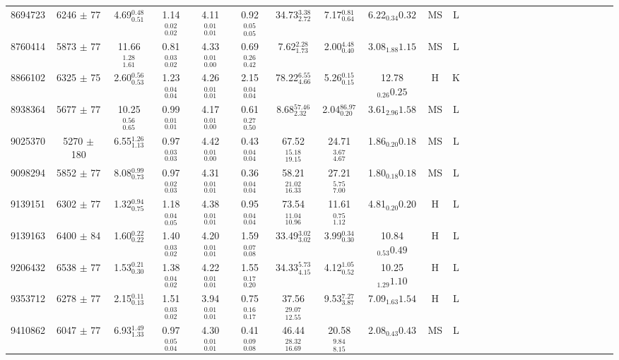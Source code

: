 \begin{table}
\begin{tabular}{cccccccccccccccccccccccccc}
8694723  & 6246 $\pm$ 77 & 4.69$_{0.51}^{0.48}$ & 1.14$_{0.02}^{0.02}$ & 4.11$_{0.01}^{0.01}$ & 0.92$_{0.05}^{0.05}$ & 34.73$_{2.72}^{3.38}$ & 7.17$_{0.64}^{0.81}$ & 6.22$_{0.34}{0.32}$ & MS & L \\
8760414  & 5873 $\pm$ 77 & 11.66$_{1.61}^{1.28}$ & 0.81$_{0.02}^{0.03}$ & 4.33$_{0.00}^{0.01}$ & 0.69$_{0.42}^{0.26}$ & 7.62$_{1.73}^{2.28}$ & 2.00$_{0.40}^{4.48}$ & 3.08$_{1.88}{1.15}$ & MS & L \\
8866102  & 6325 $\pm$ 75 & 2.60$_{0.53}^{0.56}$ & 1.23$_{0.04}^{0.04}$ & 4.26$_{0.01}^{0.01}$ & 2.15$_{0.04}^{0.04}$ & 78.22$_{4.66}^{6.55}$ & 5.26$_{0.15}^{0.15}$ & 12.78$_{0.26}{0.25}$ & H & K \\
8938364  & 5677 $\pm$ 77 & 10.25$_{0.65}^{0.56}$ & 0.99$_{0.01}^{0.01}$ & 4.17$_{0.00}^{0.01}$ & 0.61$_{0.50}^{0.27}$ & 8.68$_{2.32}^{57.46}$ & 2.04$_{0.20}^{86.97}$ & 3.61$_{2.96}{1.58}$ & MS & L \\
9025370  & 5270 $\pm$ 180 & 6.55$_{1.13}^{1.26}$ & 0.97$_{0.03}^{0.03}$ & 4.42$_{0.00}^{0.01}$ & 0.43$_{0.04}^{0.04}$ & 67.52$_{19.15}^{15.18}$ & 24.71$_{4.67}^{3.67}$ & 1.86$_{0.20}{0.18}$ & MS & L \\
9098294  & 5852 $\pm$ 77 & 8.08$_{0.73}^{0.99}$ & 0.97$_{0.03}^{0.02}$ & 4.31$_{0.01}^{0.01}$ & 0.36$_{0.04}^{0.04}$ & 58.21$_{16.33}^{21.02}$ & 27.21$_{7.00}^{5.75}$ & 1.80$_{0.18}{0.18}$ & MS & L \\
9139151  & 6302 $\pm$ 77 & 1.32$_{0.75}^{0.94}$ & 1.18$_{0.05}^{0.04}$ & 4.38$_{0.01}^{0.01}$ & 0.95$_{0.04}^{0.04}$ & 73.54$_{10.96}^{11.04}$ & 11.61$_{1.12}^{0.75}$ & 4.81$_{0.20}{0.20}$ & H & L \\
9139163  & 6400 $\pm$ 84 & 1.60$_{0.22}^{0.22}$ & 1.40$_{0.02}^{0.03}$ & 4.20$_{0.01}^{0.01}$ & 1.59$_{0.08}^{0.07}$ & 33.49$_{3.02}^{3.02}$ & 3.99$_{0.30}^{0.34}$ & 10.84$_{0.53}{0.49}$ & H & L \\
9206432  & 6538 $\pm$ 77 & 1.53$_{0.30}^{0.21}$ & 1.38$_{0.02}^{0.04}$ & 4.22$_{0.01}^{0.01}$ & 1.55$_{0.20}^{0.17}$ & 34.33$_{4.15}^{5.73}$ & 4.12$_{0.52}^{1.05}$ & 10.25$_{1.29}{1.10}$ & H & L \\
9353712  & 6278 $\pm$ 77 & 2.15$_{0.13}^{0.11}$ & 1.51$_{0.02}^{0.03}$ & 3.94$_{0.01}^{0.01}$ & 0.75$_{0.17}^{0.16}$ & 37.56$_{12.55}^{29.07}$ & 9.53$_{3.87}^{7.27}$ & 7.09$_{1.63}{1.54}$ & H & L \\
9410862  & 6047 $\pm$ 77 & 6.93$_{1.33}^{1.49}$ & 0.97$_{0.04}^{0.05}$ & 4.30$_{0.01}^{0.01}$ & 0.41$_{0.08}^{0.09}$ & 46.44$_{16.69}^{28.32}$ & 20.58$_{8.15}^{9.84}$ & 2.08$_{0.43}{0.43}$ & MS & L \\

\end{tabular}
\end{table}
